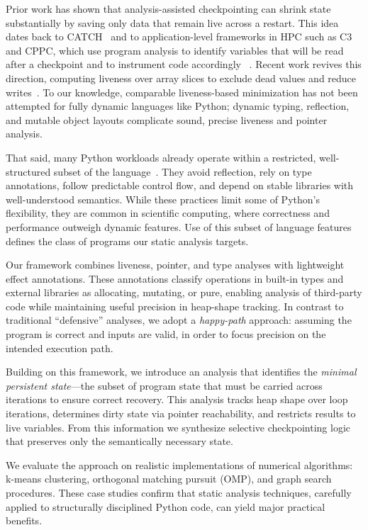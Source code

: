 Prior work has shown that analysis-assisted checkpointing can shrink state substantially by saving only data that remain live across a restart. This idea dates back to CATCH~\cite{li1990catch} and to application-level frameworks in HPC such as C3 and CPPC, which use program analysis to identify variables that will be read after a checkpoint and to instrument code accordingly ~\cite{bronevetsky2004application,rodriguez2010cppc}. Recent work revives this direction, computing liveness over array slices to exclude dead values and reduce writes~\cite{kim2024lact}. To our knowledge, comparable liveness-based minimization has not been attempted for fully dynamic languages like Python; dynamic typing, reflection, and mutable object layouts complicate sound, precise liveness and pointer analysis.

That said, many Python workloads already operate within a restricted, well-structured subset of the language~\cite{bence2021unambiguity}. They avoid reflection, rely on type annotations, follow predictable control flow, and depend on stable libraries with well-understood semantics. While these practices limit some of Python’s flexibility, they are common in scientific computing, where correctness and performance outweigh dynamic features. Use of this subset of language features defines the class of programs our static analysis targets.

Our framework combines liveness, pointer, and type analyses with lightweight effect annotations. These annotations classify operations in built-in types and external libraries as allocating, mutating, or pure, enabling analysis of third-party code while maintaining useful precision in heap-shape tracking. In contrast to traditional ``defensive'' analyses, we adopt a \emph{happy-path} approach: assuming the program is correct and inputs are valid, in order to focus precision on the intended execution path.

Building on this framework, we introduce an analysis that identifies the \emph{minimal persistent state}—the subset of program state that must be carried across iterations to ensure correct recovery. This analysis tracks heap shape over loop iterations, determines dirty state via pointer reachability, and restricts results to live variables. From this information we synthesize selective checkpointing logic that preserves only the semantically necessary state.

We evaluate the approach on realistic implementations of numerical algorithms: k-means clustering, orthogonal matching pursuit (OMP), and graph search procedures. These case studies confirm that static analysis techniques, carefully applied to structurally disciplined Python code, can yield major practical benefits.


